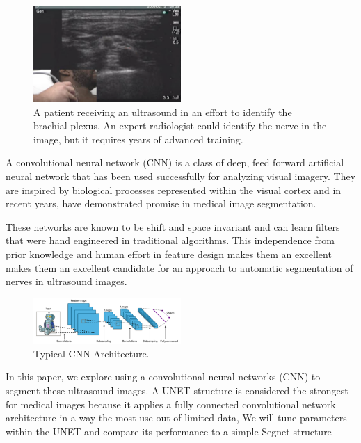 \documentclass[letterpaper]{article}
\begin{document}
 \begin{figure}[H]
  \centerline{\includegraphics[width=0.5\textwidth]{Images/UltrasoundNerve.png}}
  \caption{A patient receiving an ultrasound in an effort to identify the brachial plexus. An expert radiologist could identify the nerve in the image, but it requires years of advanced training.}
  \label{fig:cnnarchitecture}
\end{figure}

A convolutional neural network (CNN) is a class of deep, feed forward artificial neural network that has been used successfully for analyzing visual imagery. They are inspired by biological processes represented within the visual cortex and in recent years, have demonstrated promise in medical image segmentation. 

These networks are known to be shift and space invariant and can learn filters that were hand engineered in traditional algorithms. This independence from prior knowledge and human effort in feature design makes them an excellent makes them an excellent candidate for an approach to automatic segmentation of nerves in ultrasound images. 



 \begin{figure}[H]
  \centerline{\includegraphics[width=0.5\textwidth]{Images/TypicalCNN.png}}
  \caption{Typical CNN Architecture.}
  \label{fig:cnnarchitecture}
\end{figure}

In this paper, we explore using a convolutional neural networks (CNN) to segment these ultrasound images. A UNET structure is considered the strongest for medical images because it applies a fully connected convolutional network architecture in a way the most use out of limited data, We will tune parameters within the UNET and compare its  performance to a simple Segnet structure 
\end{document}
